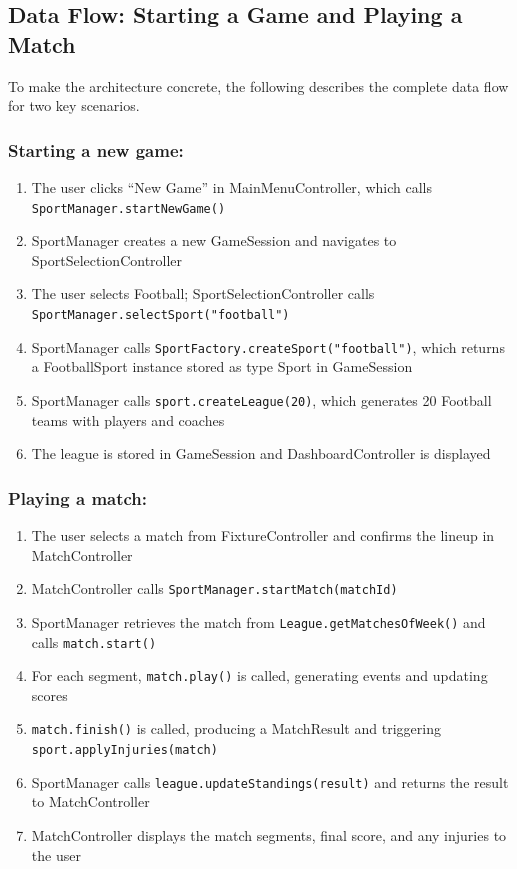 \documentclass[12pt, a4paper]{article}
\begin{document}
\subsection{Data Flow: Starting a Game and Playing a Match}

To make the architecture concrete, the following describes the complete data flow for two key
scenarios.

\subsubsection*{Starting a new game:}

\begin{enumerate}
    \item The user clicks ``New Game'' in MainMenuController, which calls \texttt{SportManager.}\allowbreak\texttt{startNewGame()}
    \item SportManager creates a new GameSession and navigates to SportSelectionController
    \item The user selects Football; SportSelectionController calls \texttt{SportManager.}\allowbreak\texttt{selectSport("football")}
    \item SportManager calls \texttt{SportFactory.}\allowbreak\texttt{createSport("football")}, which returns a FootballSport instance stored as type Sport in GameSession
    \item SportManager calls \texttt{sport.}\allowbreak\texttt{createLeague(20)}, which generates 20 Football teams with players and coaches
    \item The league is stored in GameSession and DashboardController is displayed
\end{enumerate}

\subsubsection*{Playing a match:}

\begin{enumerate}
    \item The user selects a match from FixtureController and confirms the lineup in MatchController
    \item MatchController calls \texttt{SportManager.}\allowbreak\texttt{startMatch(matchId)}
    \item SportManager retrieves the match from \texttt{League.getMatchesOfWeek()} and calls \texttt{match.start()}
    \item For each segment, \texttt{match.play()} is called, generating events and updating scores
    \item \texttt{match.finish()} is called, producing a MatchResult and triggering \texttt{sport.}\allowbreak\texttt{applyInjuries(match)}
    \item SportManager calls \texttt{league.updateStandings(result)} and returns the result to MatchController
    \item MatchController displays the match segments, final score, and any injuries to the user
\end{enumerate}
\end{document}

